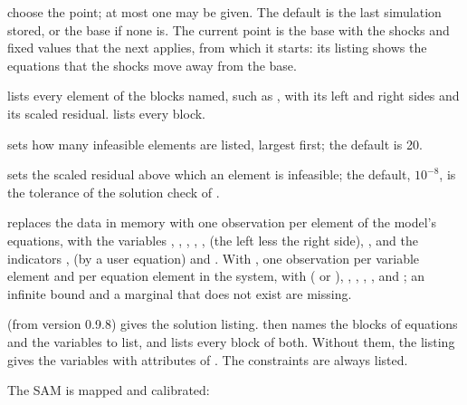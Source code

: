\begin{optdesc}
\item[\optarg{}{sim}{name}, \opt{}{base}, \opt{cur}{rent}] choose the point;
at most one may be given. The default is the last simulation stored, or the
base if none is. The current point is the base with the shocks and fixed
values that the next  applies, from which it starts: its
listing shows the equations that the shocks move away from the base.

\item[\optarg{block}{s}{list}] lists every element of the blocks named, such as
, with its left and right sides and its scaled residual.
 lists every block.

\item[\optarg{}{top}{\#}] sets how many infeasible elements are listed, largest
first; the default is 20.

\item[\optarg{tol}{erance}{\#}] sets the scaled residual above which an element
is infeasible; the default, $10^{-8}$, is the tolerance of the solution check
of .

\item[\opt{}{clear}] replaces the data in memory with one observation per
element of the model's equations, with the variables ,
, , , ,  (the
left less the right side), , and the indicators ,
 (by a user equation) and . With
, one observation per variable element and per equation
element in the system, with  ( or ), ,
, , ,  and ; an
infinite bound and a marginal that does not exist are missing.

\item[\opt{sol}{ution}] (from version 0.9.8) gives the solution listing.
 then names the blocks of equations and
 the variables to list, and  lists every
block of both. Without them, the listing gives the variables with attributes of
. The constraints are always listed.
\end{optdesc}


The SAM is mapped and calibrated:


